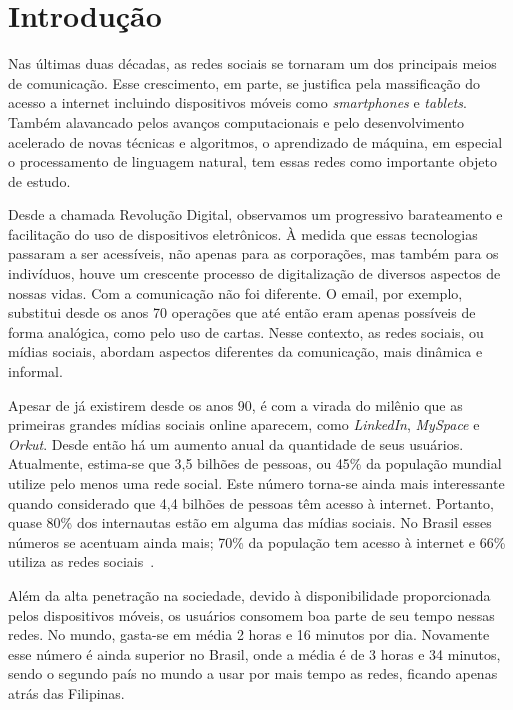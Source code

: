 \chapter{Introdução}
\label{chapter:intro}

Nas últimas duas décadas, as redes sociais se tornaram um dos principais meios de
comunicação.
Esse crescimento, em parte, se justifica pela massificação do acesso a internet
incluindo dispositivos móveis como \textit{smartphones} e \textit{tablets}.
Também alavancado pelos avanços computacionais e pelo desenvolvimento acelerado
de novas técnicas e algoritmos, o aprendizado de máquina, em especial o
processamento de linguagem natural, tem essas redes como importante objeto de
estudo.

Desde a chamada Revolução Digital, observamos um progressivo barateamento e
facilitação do uso de dispositivos eletrônicos.
À medida que essas tecnologias passaram a ser acessíveis, não apenas para as
corporações, mas também para os indivíduos, houve um crescente processo de
digitalização de diversos aspectos de nossas vidas.
Com a comunicação não foi diferente.
O email, por exemplo, substitui desde os anos 70 operações que até então eram
apenas possíveis de forma analógica, como pelo uso de cartas.
Nesse contexto, as redes sociais, ou mídias sociais, abordam aspectos diferentes
da comunicação, mais dinâmica e informal.

Apesar de já existirem desde os anos 90, é com a virada do milênio que as
primeiras grandes mídias sociais online aparecem, como \textit{LinkedIn},
\textit{MySpace} e \textit{Orkut}.
Desde então há um aumento anual da quantidade de seus usuários.
Atualmente, estima-se que 3,5 bilhões de pessoas, ou 45\% da população mundial
utilize pelo menos uma rede social.
Este número torna-se ainda mais interessante quando considerado que 4,4 bilhões
de pessoas têm acesso à internet.
Portanto, quase 80\% dos internautas estão em alguma das mídias sociais.
No Brasil esses números se acentuam ainda mais; 70\% da população tem
acesso à internet e 66\% utiliza as redes sociais~\cite{social19}.

Além da alta penetração na sociedade, devido à disponibilidade proporcionada
pelos dispositivos móveis, os usuários consomem boa parte de seu tempo nessas
redes.
No mundo, gasta-se em média 2 horas e 16 minutos por dia.
Novamente esse número é ainda superior no Brasil, onde a média é de 3 horas e
34 minutos, sendo o segundo país no mundo a usar por mais tempo as redes, ficando
apenas atrás das Filipinas.

